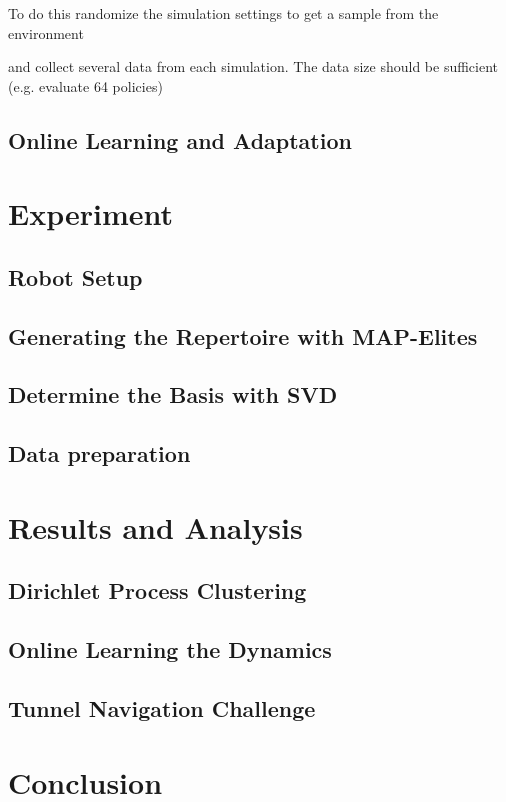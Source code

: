 \documentclass[journal]{IEEEtran}
\begin{document}
To do this randomize the simulation settings to get a sample from the environment

and collect several data from each simulation.
The data size should be sufficient (e.g. evaluate 64 policies)




\subsection{Online Learning and Adaptation}



\section{Experiment}


\subsection{Robot Setup}


\subsection{Generating the Repertoire with MAP-Elites}

\subsection{Determine the Basis with SVD}

\subsection{Data preparation}





\section{Results and Analysis}

\subsection{Dirichlet Process Clustering}


\subsection{Online Learning the Dynamics}

\subsection{Tunnel Navigation Challenge}


\section{Conclusion}








\end{document}
